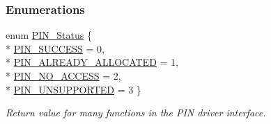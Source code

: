 \subsubsection*{Enumerations}
\begin{DoxyCompactItemize}
\item 
enum \hyperlink{_p_i_n_8h_abe0ad59bbf09e51fe37195a5e70b23f6}{P\+I\+N\+\_\+\+Status} \{ \\*
\hyperlink{_p_i_n_8h_abe0ad59bbf09e51fe37195a5e70b23f6a5c9610fffc152c333036f2c2c7ee54e8}{P\+I\+N\+\_\+\+S\+U\+C\+C\+E\+S\+S} = 0, 
\\*
\hyperlink{_p_i_n_8h_abe0ad59bbf09e51fe37195a5e70b23f6a8280bb6c2bd8ef1fc6f9e24d3d8ed864}{P\+I\+N\+\_\+\+A\+L\+R\+E\+A\+D\+Y\+\_\+\+A\+L\+L\+O\+C\+A\+T\+E\+D} = 1, 
\\*
\hyperlink{_p_i_n_8h_abe0ad59bbf09e51fe37195a5e70b23f6a25bb5dfe42957cfd0922fc1ece880453}{P\+I\+N\+\_\+\+N\+O\+\_\+\+A\+C\+C\+E\+S\+S} = 2, 
\\*
\hyperlink{_p_i_n_8h_abe0ad59bbf09e51fe37195a5e70b23f6a7abd102afc68f4c599c11f8f9c79e7ab}{P\+I\+N\+\_\+\+U\+N\+S\+U\+P\+P\+O\+R\+T\+E\+D} = 3
 \}
\begin{DoxyCompactList}\small\item\em Return value for many functions in the P\+I\+N driver interface. \end{DoxyCompactList}\end{DoxyCompactItemize}
